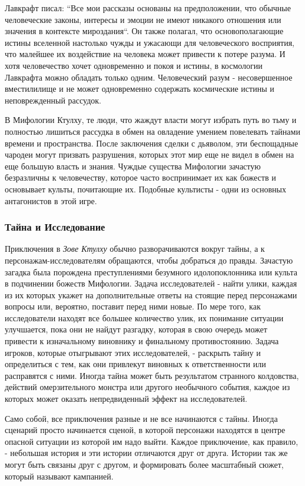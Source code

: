 \documentclass[letterpaper,twocolumn,openany, twoside, 8pt, usenames]{cocbook}
\begin{document}
Лавкрафт писал: ``Все мои рассказы основаны на предположении, что обычные человеческие законы, интересы и эмоции не имеют никакого отношения или значения в контексте мироздания``. Он также полагал, что основополагающие истины вселенной настолько чужды и ужасающи для человеческого восприятия, что малейшее их воздействие на человека может привести к потере разума. И хотя человечество хочет одновременно и покоя и истины, в космологии Лавкрафта можно обладать только одним. Человеческий разум - несовершенное вместилилище и не может одновременно содержать космические истины и неповрежденный рассудок.

В Мифологии Ктулху, те люди, что жаждут власти могут избрать путь во тьму и полностью лишиться рассудка в обмен на овладение умением повелевать тайнами времени и пространства. После заключения сделки с дьяволом, эти беспощадные чародеи могут призвать разрушения, которых этот мир еще не видел в обмен на еще большую власть и знания. Чуждые существа Мифологии зачастую безразличны к человечеству, которое часто воспринимает их как божеств и основывает культы, почитающие их. Подобные культисты - одни из основных антагонистов в этой игре.

\subsubsection*{\nohyphens{Тайна и Исследование}}

Приключения в {\it Зове Ктулху} обычно разворачиваются вокруг тайны, а к персонажам-исследователям обращаются, чтобы добраться до правды. Зачастую загадка была порождена преступлениями безумного идолопоклонника или культа в подчинении божеств Мифологии. Задача исследователей - найти улики, каждая из их которых укажет на дополнительные ответы на стоящие перед персонажами вопросы или, вероятно, поставит перед ними новые. По мере того, как исследователи находят все большее количество улик, их понимание ситуации улучшается, пока они не найдут разгадку, которая в свою очередь может привести к изначальному виновнику и финальному противостоянию. Задача игроков, которые отыгрывают этих исследователей, - раскрыть тайну и определиться с тем, как они привлекут виновных к ответственности или расправятся с ними. Иногда тайна может быть результатом странного колдовства, действий омерзительного монстра или другого необычного события, каждое из которых может оказать непредвиденный эффект на исследователей.

Само собой, все приключения разные и не все начинаются с тайны. Иногда сценарий просто начинается сценой, в которой персонажи находятся в центре опасной ситуации из которой им надо выйти. Каждое приключение, как правило, - небольшая история и эти истории отличаются друг от друга. Истории так же могут быть связаны друг с другом, и формировать более масштабный сюжет, который называют кампанией.
\end{document}
